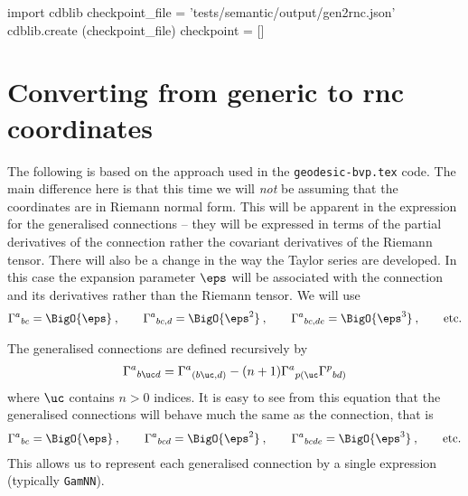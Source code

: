 \documentclass[12pt]{cdblatex}
\begin{document}

\bgroup
{}
\begin{cadabra}
   import cdblib
   checkpoint_file = 'tests/semantic/output/gen2rnc.json'
   cdblib.create (checkpoint_file)
   checkpoint = []
\end{cadabra}
\egroup

\section*{Converting from generic to rnc coordinates}

The following is based on the approach used in the {\tt geodesic-bvp.tex} code.
The main difference here is that this time we will \emph{not} be assuming that the coordinates
are in Riemann normal form. This will be apparent in the expression for the generalised
connections -- they will be expressed in terms of the partial derivatives of the connection
rather the covariant derivatives of the Riemann tensor. There will also be a change in the
way the Taylor series are developed. In this case the expansion parameter $\eps$ will be
associated with the connection and its derivatives rather than the Riemann tensor. We will use
\begin{gather*}
   \Gamma^{a}{}_{bc} = \BigO{\eps}\>,\qquad
   \Gamma^{a}{}_{bc,d} = \BigO{\eps^2}\>,\qquad
   \Gamma^{a}{}_{bc,de} = \BigO{\eps^3}\>,\qquad
   \text{etc.}
\end{gather*}

The generalised connections are defined recursively by
\begin{align}
   \label{eq:GenGamma}
\Gamma^{a}{}_{b\uc d} = \Gamma^{a}{}_{(b\uc,d)}
                - (n+1) \Gamma^{a}{}_{p(\uc}
                        \Gamma^{p}{}_{bd)}
\end{align}
where $\uc$ contains $n>0$ indices. It is easy to see from this equation that the generalised
connections will behave much the same as the connection, that is
\begin{gather*}
   \Gamma^{a}{}_{bc} = \BigO{\eps}\>,\qquad
   \Gamma^{a}{}_{bcd} = \BigO{\eps^2}\>,\qquad
   \Gamma^{a}{}_{bcde} = \BigO{\eps^3}\>,\qquad
   \text{etc.}
\end{gather*}
This allows us to represent each generalised connection by a single expression (typically {\tt GamNN}).
\end{document}
